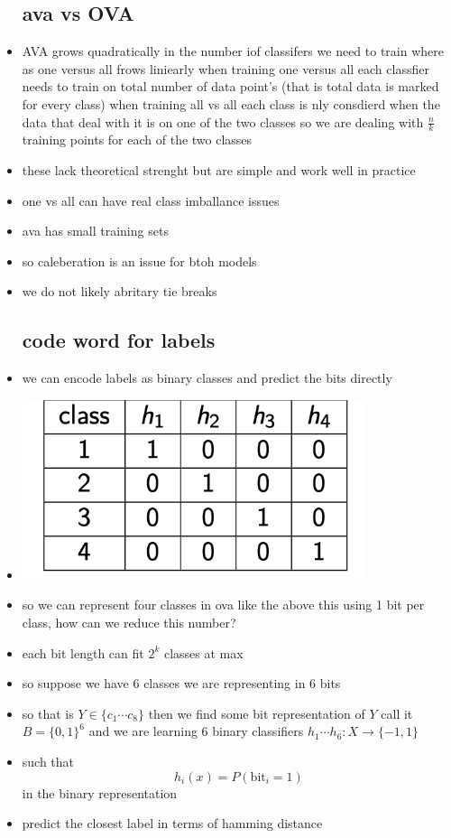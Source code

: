 \documentclass{article}
\begin{document}
\begin{itemize}
\subsection*{ava vs OVA}
\item AVA grows quadratically in the number iof classifers we need to train where as one versus all frows liniearly
when training one versus all each classfier needs to train on total number of data point's (that is total data is marked for every class)
when training all vs all each class is nly consdierd when the data that deal with it is on one of the two classes so we are dealing with $\frac{n}{k}$ training points for each of the two classes
\item these lack theoretical strenght but are simple and work well in practice
\item one vs all can have real class imballance issues 
\item ava has small training sets 
\item so caleberation is an issue for btoh models 
\item we do not likely abritary tie breaks 
\subsection*{code word for labels}
\item we can encode labels as binary classes and predict the bits directly 
\item \includegraphics*[width=10cm]{images/Screenshot 2023-05-14 at 3.23.05 PM.png} 
\item so we can represent four classes in ova like the above this using 1 bit per class, how can we reduce this number?
\item each bit length can fit $2^{k}$ classes at max 
\item so suppose we have 6 classes we are representing in 6 bits
\item so that is $Y\in \{c_1\cdots c_8\}$ then we find some bit representation of $Y$ call it $B=\{0,1\}^{6}$ and we are learning 6 binary classifiers $h_1\cdots h_6:X\rightarrow \{-1,1\}$ 
\item such that $$h_{i}(x)=P(\text{bit}_i=1)$$ in the binary representation 
\item predict the closest label in terms of hamming distance  


\end{itemize}
\end{document}
